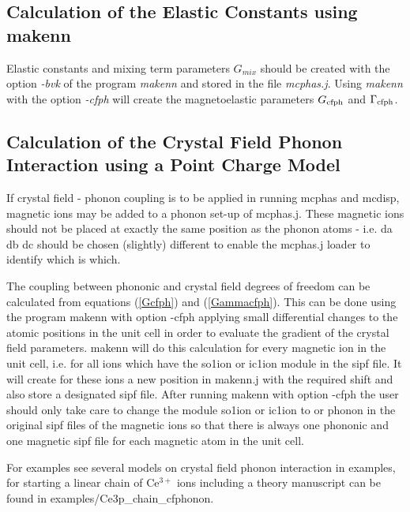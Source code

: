 \subsection{Calculation of the Elastic Constants using {\prg makenn}}\label{determineElconst}

Elastic constants and mixing term parameters $G_{mix}$ should be created with the
option {\em -bvk} of the program {\em makenn} and stored in the 
file {\em mcphas.j}. Using {\em makenn} with the option {\em -cfph} will create
the magnetoelastic parameters $G_{\rm cfph}$ and $\Gamma_{\rm cfph}$.

\subsection{Calculation of the Crystal Field Phonon Interaction using a Point Charge Model}\label{determineBlmfromPC}

If crystal field - phonon coupling is to be applied in running {\prg mcphas} and {\prg mcdisp},
 magnetic ions may be added to a phonon set-up of {\prg mcphas.j}.
These magnetic ions should not be placed at exactly the same position as the phonon atoms - i.e. da db dc should be chosen
(slightly) different to enable the mcphas.j loader to identify which is which.

The coupling between phononic and crystal field degrees of freedom can be calculated from equations
(\ref{Gcfph}) and (\ref{Gammacfph}).
 This can be done
using the program  {\prg makenn} with option {\prg -cfph}  applying small differential changes to
the atomic positions in the unit cell in order to evaluate the gradient of the crystal field
parameters. {\prg makenn} will do this calculation for every magnetic ion in the unit cell,
i.e. for all ions which have the {\prg so1ion} or {\prg ic1ion} module in the {\prg sipf} file.
It will create for these ions a new position in makenn.j with the required
shift and also store a designated sipf file. After running {\prg makenn} with option {\prg -cfph} 
the user should only take care to change the module {\prg so1ion}  or {\prg ic1ion} to  or {\prg phonon}
in the original sipf files of the magnetic ions so that there is always one phononic and one magnetic
sipf file for each magnetic atom in the unit cell.

For examples see  several models on crystal field phonon interaction 
in {\prg examples}, for starting a linear chain of Ce$^{3+}$ ions including a
theory manuscript can be found in {\prg examples/Ce3p\_chain\_cfphonon}.


